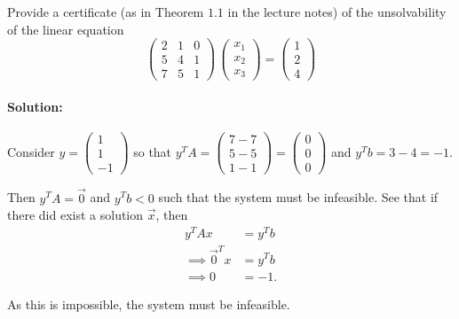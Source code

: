 \documentclass[11pt]{article}
\institute{\'Ecole Polytechnique F\'ed\'erale de Lausanne}
\begin{document}
\makeheader

\problem
Provide a certificate (as in Theorem $1.1$ in the lecture notes) of the unsolvability of the linear equation 
  \begin{displaymath}
    \begin{pmatrix}
      2 & 1 & 0 \\
      5 & 4 & 1 \\
      7 & 5 & 1
    \end{pmatrix} \,
    \begin{pmatrix}
      x_1 \\ x_2 \\ x_3 
    \end{pmatrix} =
    \begin{pmatrix}
      1\\2\\4
    \end{pmatrix}
  \end{displaymath}
  
  \paragraph{Solution:}
  
  Consider $y = \begin{pmatrix} 1 \\ 1 \\ -1 \end{pmatrix}$ so that $y^T A = \begin{pmatrix} 7-7 \\ 5-5 \\ 1-1 \end{pmatrix} = \begin{pmatrix}0 \\ 0 \\ 0 \end{pmatrix}$ and $y^T b = 3-4 = -1$. 
  
  Then $y^T A = \vec{0}$ and $y^T b < 0$ such that the system must be infeasible. See that if there did exist a solution $\vec{x}$, then 
  \begin{align*}
  y^TA x & = y^T b \\
  \implies \vec{0}^T x & = y^Tb \\
  \implies 0 & = -1.
  \end{align*}
  
  As this is impossible, the system must be infeasible. 
  
  
 

  \problem
\end{document}
